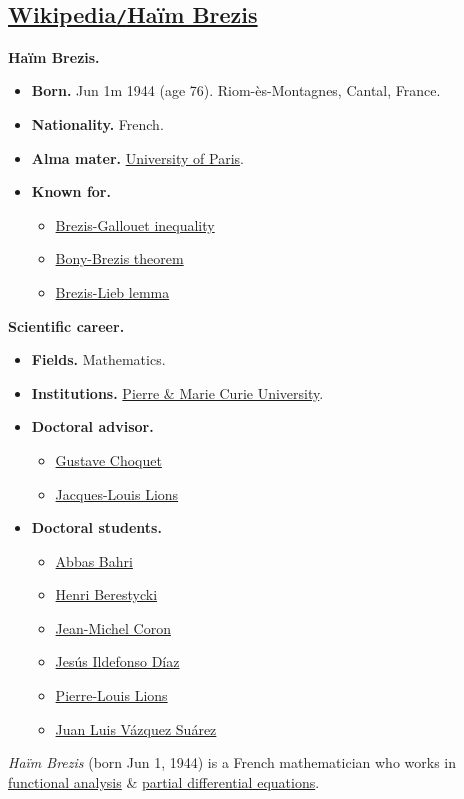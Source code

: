 \documentclass{article}
\begin{document}
\subsection{\href{https://en.wikipedia.org/wiki/Haim_Brezis}{Wikipedia{\tt/}Ha\"im Brezis}}
\textbf{Haïm Brezis.}
\begin{itemize}
	\item \textbf{Born.} Jun 1m 1944 (age 76). Riom-ès-Montagnes, Cantal, France.
	\item \textbf{Nationality.} French.
	\item \textbf{Alma mater.} \href{https://en.wikipedia.org/wiki/University_of_Paris}{University of Paris}.
	\item \textbf{Known for.}
	\begin{itemize}
		\item \href{https://en.wikipedia.org/wiki/Brezis-Gallouet_inequality}{Brezis-Gallouet inequality}
		\item \href{https://en.wikipedia.org/wiki/Bony-Brezis_theorem}{Bony-Brezis theorem}
		\item \href{https://en.wikipedia.org/wiki/Brezis-Lieb_lemma}{Brezis-Lieb lemma}
	\end{itemize}
\end{itemize}
\textbf{Scientific career.}
\begin{itemize}
	\item \textbf{Fields.} Mathematics.
	\item \textbf{Institutions.} \href{https://en.wikipedia.org/wiki/Pierre_and_Marie_Curie_University}{Pierre \& Marie Curie University}.
	\item \textbf{Doctoral advisor.}
	\begin{itemize}
		\item \href{https://en.wikipedia.org/wiki/Gustave_Choquet}{Gustave Choquet}
		\item \href{https://en.wikipedia.org/wiki/Jacques-Louis_Lions}{Jacques-Louis Lions}
	\end{itemize}
	\item \textbf{Doctoral students.}
	\begin{itemize}
		\item \href{https://en.wikipedia.org/wiki/Abbas_Bahri}{Abbas Bahri}
		\item \href{https://en.wikipedia.org/wiki/Jean-Michel_Coron}{Henri Berestycki}
		\item \href{https://en.wikipedia.org/wiki/Jean-Michel_Coron}{Jean-Michel Coron}
		\item \href{https://en.wikipedia.org/wiki/Jes%C3%BAs_Ildefonso_D%C3%ADaz}{Jes\'us Ildefonso D\'iaz}
		\item \href{https://en.wikipedia.org/wiki/Pierre-Louis_Lions}{Pierre-Louis Lions}
		\item \href{https://en.wikipedia.org/wiki/Juan_Luis_V%C3%A1zquez_Su%C3%A1rez}{Juan Luis V\'azquez Su\'arez}
	\end{itemize}
\end{itemize}
\textit{Haïm Brezis} (born Jun 1, 1944) is a French mathematician who works in \href{https://en.wikipedia.org/wiki/Functional_analysis}{functional analysis} \& \href{https://en.wikipedia.org/wiki/Partial_differential_equation}{partial differential equations}.
\end{document}

